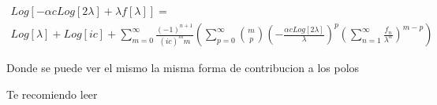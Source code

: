 \begin{equation}
\begin{array}{c}
Log[- \alpha c Log[2 \lambda] + \lambda f[\lambda] ] = \\
Log[\lambda] + Log[i c] + 
\sum _{m=0} ^{\infty} \frac{(-1)^{n+1}}{(i c) ^m m}
							\left(
								\sum _{p=0} ^{\infty} {m\choose p} 
									\left( - \frac{ \alpha c Log[2 \lambda] } {\lambda} \right) ^p
									\left( \sum _{n=1} ^{\infty} \frac{f _n}{\lambda ^n} \right) ^{m-p} 
								\right)
\end{array}
\end{equation}

Donde se puede ver el mismo la misma forma de contribucion a los polos 



Te recomiendo leer \cite{yo}
